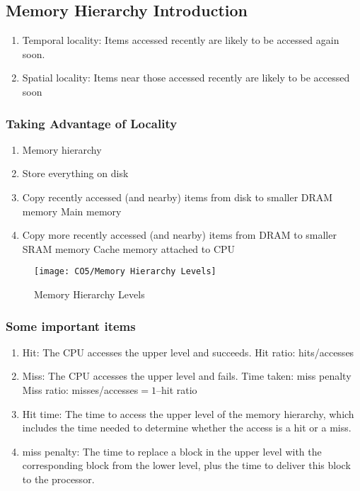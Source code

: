 \subsection{Memory Hierarchy Introduction}
\begin{enumerate}\small
    \item Temporal locality: Items accessed recently are likely to be accessed again soon.
    \item Spatial locality: Items near those accessed recently are likely to be accessed soon
\end{enumerate}

\subsubsection{Taking Advantage of Locality}
\begin{enumerate}\small
    \item Memory hierarchy
    \item Store everything on disk
    \item Copy recently accessed (and nearby) items from disk to smaller DRAM memory
    \subitem Main memory
    \item Copy more recently accessed (and nearby) items from DRAM to smaller SRAM memory
    \subitem Cache memory attached to CPU
\end{enumerate}

\begin{figure}[!htb]
    \centering
    \texttt{[image: CO5/Memory Hierarchy Levels]}
    \caption{Memory Hierarchy Levels}
\end{figure}

\subsubsection{Some important items}
\begin{enumerate}\small
    \item Hit: The CPU accesses the upper level and succeeds.
    \subitem Hit ratio: hits/accesses
    \item Miss: The CPU accesses the upper level and fails.
    \subitem Time taken: miss penalty
    \subitem Miss ratio: misses/accesses$= 1 – $hit ratio
    \item Hit time: The time to access the upper level of the memory hierarchy, which includes the time needed to determine whether the access is a hit or a miss.
    \item miss penalty: The time to replace a block in the upper level with the corresponding block from the lower level, plus the time to deliver this block to the processor.
\end{enumerate}


